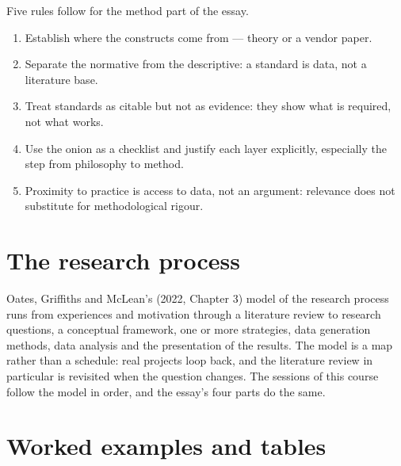 \documentclass[11pt,a4paper,british,twoside=false,headings=small,chapterprefix=false,numbers=noenddot]{scrbook}
\begin{document}
Five rules follow for the method part of the essay.
\begin{enumerate}
  \item Establish where the constructs come from --- theory or a vendor paper.
  \item Separate the normative from the descriptive: a standard is data, not a literature base.
  \item Treat standards as citable but not as evidence: they show what is required, not what works.
  \item Use the onion as a checklist and justify each layer explicitly, especially the step from philosophy to method.
  \item Proximity to practice is access to data, not an argument: relevance does not substitute for methodological rigour.
\end{enumerate}

\section{The research process}

Oates, Griffiths and McLean's (2022, Chapter 3) model of the research process runs from experiences and motivation through a literature review to research questions, a conceptual framework, one or more strategies, data generation methods, data analysis and the presentation of the results. The model is a map rather than a schedule: real projects loop back, and the literature review in particular is revisited when the question changes. The sessions of this course follow the model in order, and the essay's four parts do the same.


\section{Worked examples and tables}
\end{document}
